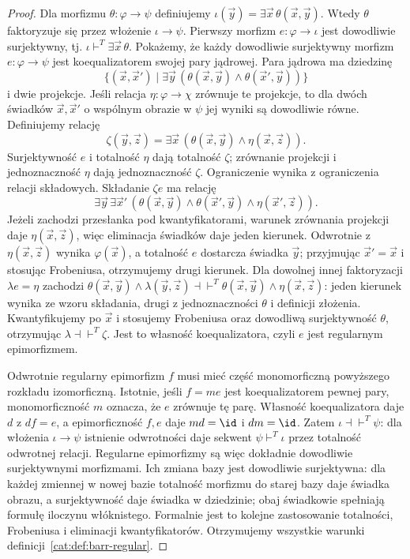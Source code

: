 \begin{proof}
Dla morfizmu $\theta:\varphi\to\psi$ definiujemy $\iota(\vec y)=\exists\vec x\,\theta(\vec x,\vec y)$. Wtedy $\theta$ faktoryzuje się przez włożenie $\iota\to\psi$. Pierwszy morfizm $e:\varphi\to\iota$ jest dowodliwie surjektywny, tj. $\iota\vdash^T\exists\vec x\,\theta$. Pokażemy, że każdy dowodliwie surjektywny morfizm $e:\varphi\to\psi$ jest koequalizatorem swojej pary jądrowej. Para jądrowa ma dziedzinę
\[
 \{(\vec x,\vec x')\mid\exists\vec y\,(\theta(\vec x,\vec y)\wedge\theta(\vec x',\vec y))\}
\]
i dwie projekcje. Jeśli relacja $\eta:\varphi\to\chi$ zrównuje te projekcje, to dla dwóch świadków $\vec x,\vec x'$ o wspólnym obrazie w $\psi$ jej wyniki są dowodliwie równe. Definiujemy relację
\[
 \zeta(\vec y,\vec z)=\exists\vec x\,(\theta(\vec x,\vec y)\wedge\eta(\vec x,\vec z)).
\]
Surjektywność $e$ i totalność $\eta$ dają totalność $\zeta$; zrównanie projekcji i jednoznaczność $\eta$ dają jednoznaczność $\zeta$. Ograniczenie wynika z ograniczenia relacji składowych. Składanie $\zeta e$ ma relację
\[
 \exists\vec y\,\exists\vec x'\,
 (\theta(\vec x,\vec y)\wedge\theta(\vec x',\vec y)\wedge\eta(\vec x',\vec z)).
\]
Jeżeli zachodzi przesłanka pod kwantyfikatorami, warunek zrównania projekcji daje $\eta(\vec x,\vec z)$, więc eliminacja świadków daje jeden kierunek. Odwrotnie z $\eta(\vec x,\vec z)$ wynika $\varphi(\vec x)$, a totalność $e$ dostarcza świadka $\vec y$; przyjmując $\vec x'=\vec x$ i stosując Frobeniusa, otrzymujemy drugi kierunek. Dla dowolnej innej faktoryzacji $\lambda e=\eta$ zachodzi $\theta(\vec x,\vec y)\wedge\lambda(\vec y,\vec z)\dashv\vdash^T\theta(\vec x,\vec y)\wedge\eta(\vec x,\vec z)$: jeden kierunek wynika ze wzoru składania, drugi z jednoznaczności $\theta$ i definicji złożenia. Kwantyfikujemy po $\vec x$ i stosujemy Frobeniusa oraz dowodliwą surjektywność $\theta$, otrzymując $\lambda\dashv\vdash^T\zeta$. Jest to własność koequalizatora, czyli $e$ jest regularnym epimorfizmem.

Odwrotnie regularny epimorfizm $f$ musi mieć część monomorficzną powyższego rozkładu izomorficzną. Istotnie, jeśli $f=me$ jest koequalizatorem pewnej pary, monomorficzność $m$ oznacza, że $e$ zrównuje tę parę. Własność koequalizatora daje $d$ z $df=e$, a epimorficzność $f,e$ daje $md=\id$ i $dm=\id$. Zatem $\iota\dashv\vdash^T\psi$: dla włożenia $\iota\to\psi$ istnienie odwrotności daje sekwent $\psi\vdash^T\iota$ przez totalność odwrotnej relacji. Regularne epimorfizmy są więc dokładnie dowodliwie surjektywnymi morfizmami. Ich zmiana bazy jest dowodliwie surjektywna: dla każdej zmiennej w nowej bazie totalność morfizmu do starej bazy daje świadka obrazu, a surjektywność daje świadka w dziedzinie; obaj świadkowie spełniają formułę iloczynu włóknistego. Formalnie jest to kolejne zastosowanie totalności, Frobeniusa i eliminacji kwantyfikatorów. Otrzymujemy wszystkie warunki definicji~\ref{cat:def:barr-regular}.


\end{proof}
